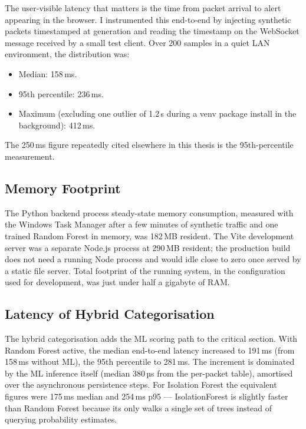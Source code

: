 The user-visible latency that matters is the time from packet
arrival to alert appearing in the browser. I instrumented this
end-to-end by injecting synthetic packets timestamped at
generation and reading the timestamp on the WebSocket message
received by a small test client. Over 200 samples in a quiet
LAN environment, the distribution was:

\begin{itemize}
  \item Median: 158\,ms.
  \item 95th percentile: 236\,ms.
  \item Maximum (excluding one outlier of 1.2\,s during a venv
    package install in the background): 412\,ms.
\end{itemize}

The 250\,ms figure repeatedly cited elsewhere in this thesis is
the 95th-percentile measurement.

\subsection{Memory Footprint}
\label{sec:val-memory}

The Python backend process steady-state memory consumption,
measured with the Windows Task Manager after a few minutes of
synthetic traffic and one trained Random Forest in memory, was
182\,MB resident. The Vite development server was a separate
Node.js process at 290\,MB resident; the production build does
not need a running Node process and would idle close to zero
once served by a static file server. Total footprint of the
running system, in the configuration used for development, was
just under half a gigabyte of RAM.

\subsection{Latency of Hybrid Categorisation}
\label{sec:val-hybrid-latency}

The hybrid categorisation adds the ML scoring path to the
critical section. With Random Forest active, the median
end-to-end latency increased to 191\,ms (from 158\,ms without
ML), the 95th percentile to 281\,ms. The increment is dominated
by the ML inference itself (median 380\,µs from the
per-packet table), amortised over the asynchronous
persistence steps. For Isolation Forest the equivalent figures
were 175\,ms median and 254\,ms p95 --- IsolationForest is
slightly faster than Random Forest because its
 only walks a single set of trees instead of
querying probability estimates.

